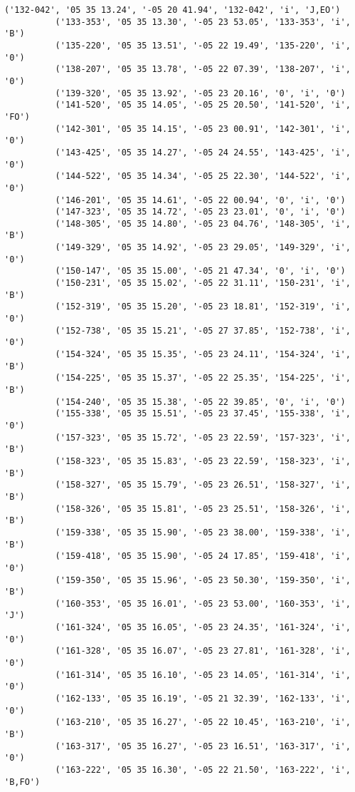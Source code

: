 \documentclass{article}
\begin{document}
\begin{Verbatim}[commandchars=\\\{\}]
          ('132-042', '05 35 13.24', '-05 20 41.94', '132-042', 'i', 'J,EO')
          ('133-353', '05 35 13.30', '-05 23 53.05', '133-353', 'i', 'B')
          ('135-220', '05 35 13.51', '-05 22 19.49', '135-220', 'i', '0')
          ('138-207', '05 35 13.78', '-05 22 07.39', '138-207', 'i', '0')
          ('139-320', '05 35 13.92', '-05 23 20.16', '0', 'i', '0')
          ('141-520', '05 35 14.05', '-05 25 20.50', '141-520', 'i', 'FO')
          ('142-301', '05 35 14.15', '-05 23 00.91', '142-301', 'i', '0')
          ('143-425', '05 35 14.27', '-05 24 24.55', '143-425', 'i', '0')
          ('144-522', '05 35 14.34', '-05 25 22.30', '144-522', 'i', '0')
          ('146-201', '05 35 14.61', '-05 22 00.94', '0', 'i', '0')
          ('147-323', '05 35 14.72', '-05 23 23.01', '0', 'i', '0')
          ('148-305', '05 35 14.80', '-05 23 04.76', '148-305', 'i', 'B')
          ('149-329', '05 35 14.92', '-05 23 29.05', '149-329', 'i', '0')
          ('150-147', '05 35 15.00', '-05 21 47.34', '0', 'i', '0')
          ('150-231', '05 35 15.02', '-05 22 31.11', '150-231', 'i', 'B')
          ('152-319', '05 35 15.20', '-05 23 18.81', '152-319', 'i', '0')
          ('152-738', '05 35 15.21', '-05 27 37.85', '152-738', 'i', '0')
          ('154-324', '05 35 15.35', '-05 23 24.11', '154-324', 'i', 'B')
          ('154-225', '05 35 15.37', '-05 22 25.35', '154-225', 'i', 'B')
          ('154-240', '05 35 15.38', '-05 22 39.85', '0', 'i', '0')
          ('155-338', '05 35 15.51', '-05 23 37.45', '155-338', 'i', '0')
          ('157-323', '05 35 15.72', '-05 23 22.59', '157-323', 'i', 'B')
          ('158-323', '05 35 15.83', '-05 23 22.59', '158-323', 'i', 'B')
          ('158-327', '05 35 15.79', '-05 23 26.51', '158-327', 'i', 'B')
          ('158-326', '05 35 15.81', '-05 23 25.51', '158-326', 'i', 'B')
          ('159-338', '05 35 15.90', '-05 23 38.00', '159-338', 'i', 'B')
          ('159-418', '05 35 15.90', '-05 24 17.85', '159-418', 'i', '0')
          ('159-350', '05 35 15.96', '-05 23 50.30', '159-350', 'i', 'B')
          ('160-353', '05 35 16.01', '-05 23 53.00', '160-353', 'i', 'J')
          ('161-324', '05 35 16.05', '-05 23 24.35', '161-324', 'i', '0')
          ('161-328', '05 35 16.07', '-05 23 27.81', '161-328', 'i', '0')
          ('161-314', '05 35 16.10', '-05 23 14.05', '161-314', 'i', '0')
          ('162-133', '05 35 16.19', '-05 21 32.39', '162-133', 'i', '0')
          ('163-210', '05 35 16.27', '-05 22 10.45', '163-210', 'i', 'B')
          ('163-317', '05 35 16.27', '-05 23 16.51', '163-317', 'i', '0')
          ('163-222', '05 35 16.30', '-05 22 21.50', '163-222', 'i', 'B,FO')

\end{Verbatim}
\end{document}
